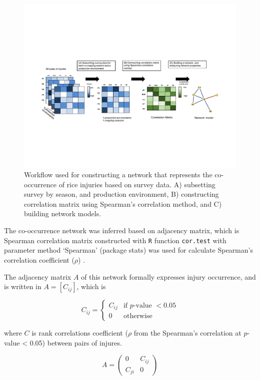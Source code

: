 \begin{figure}
\centering
\includegraphics[width = 1\textwidth]{figures/pipeline2.pdf}
\caption[Work flow used for networks construction]{Workflow used for constructing a network that represents the co-occurrence of rice injuries based on survey data. A) subsetting survey by season, and production environment, B) constructing correlation matrix using Spearman's correlation method, and C) building network models.}
\label{fig:pipeline2}
\end{figure} 

The co-occurrence network was inferred based on adjacency matrix, which is Spearman correlation matrix constructed with \texttt{R} function \texttt{cor.test} with parameter method `Spearman' (package stats) was used for calculate Spearman's correlation coefficient ($\rho$) \citep{R_2015}.

The adjacency matrix $A$ of this network formally expresses injury occurrence, and is written in $A=[C_{ij}]$, which is

\begin{equation}
C_{ij} = \begin{cases}
C_{ij} & \text{if }  p\text{-value } < 0.05 \\ 
0 & \text{otherwise}
\end{cases}
\end{equation}

where $C$ is rank correlations coefficient ($\rho$ from the Spearman’s correlation at $p$-value < 0.05) between pairs of injures.

\begin{equation}
A = \begin{pmatrix}
0 & C_{ij}\\ 
C_{ji} & 0
\end{pmatrix}
\end{equation}

